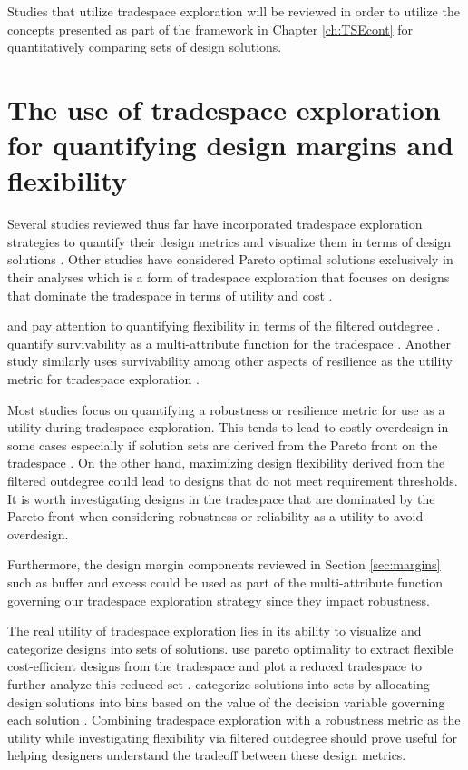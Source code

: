 Studies that utilize tradespace exploration will be reviewed in order to utilize the concepts presented as part of the framework in Chapter \ref{ch:TSEcont} for quantitatively comparing sets of design solutions.

\section{The use of tradespace exploration for quantifying design margins and flexibility} 
\label{sec:tradespace}

Several studies reviewed thus far have incorporated tradespace exploration strategies to quantify their design metrics and visualize them in terms of design solutions \cite{Rehn2018,McManus2007,Viscito2009,Small2019}. Other studies have considered Pareto optimal solutions exclusively in their analyses which is a form of tradespace exploration that focuses on designs that dominate the tradespace in terms of utility and cost \cite{Villanueva2014,Cross2015}. 

\citeauthor{Viscito2009} and \citeauthor{Rehn2018} pay attention to quantifying flexibility in terms of the filtered outdegree \cite{Viscito2009,Rehn2018}. \citeauthor{McManus2007} quantify survivability as a multi-attribute function for the tradespace \cite{McManus2007}. Another study similarly uses survivability among other aspects of resilience as the utility metric for tradespace exploration \cite{Small2019}.

Most studies focus on quantifying a robustness or resilience metric for use as a utility during tradespace exploration. This tends to lead to costly overdesign in some cases especially if solution sets are derived from the Pareto front on the tradespace \cite{Long2017}. On the other hand, maximizing design flexibility derived from the filtered outdegree could lead to designs that do not meet requirement thresholds. It is worth investigating designs in the tradespace that are dominated by the Pareto front when considering robustness or reliability as a utility to avoid overdesign.

Furthermore, the design margin components reviewed in Section \ref{sec:margins} such as buffer and excess could be used as part of the multi-attribute function governing our tradespace exploration strategy since they impact robustness.

The real utility of tradespace exploration lies in its ability to visualize and categorize designs into sets of solutions. \citeauthor{Viscito2009} use pareto optimality to extract flexible cost-efficient designs from the tradespace and plot a reduced tradespace to further analyze this reduced set \cite{Viscito2009}. \citeauthor{Small2019} categorize solutions into sets by allocating design solutions into bins based on the value of the decision variable governing each solution \cite{Small2019}. Combining tradespace exploration with a robustness metric as the utility while investigating flexibility via filtered outdegree should prove useful for helping designers understand the tradeoff between these design metrics.

